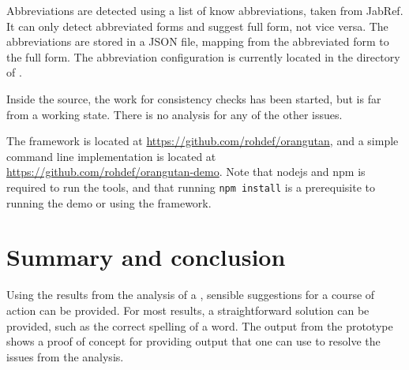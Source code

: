 Abbreviations are detected using a list of know abbreviations, taken
from JabRef.  It can only detect abbreviated forms and suggest full
form, not vice versa.  The abbreviations are stored in a JSON file,
mapping from the abbreviated form to the full form. The abbreviation
configuration is currently located in the directory of {\orangutan}.

Inside the {\orangutan} source, the work for consistency checks has
been started, but is far from a working state.  There is no analysis
for any of the other issues.

The {\orangutan} framework is located at
\url{https://github.com/rohdef/orangutan}, and a simple command line
implementation is located at
\url{https://github.com/rohdef/orangutan-demo}.  Note that nodejs and
npm is required to run the tools, and that running \texttt{npm
  install} is a prerequisite to running the demo or using the
framework.


\section{Summary and conclusion}

Using the results from the analysis of a , sensible
suggestions for a course of action can be provided.  For most results,
a straightforward solution can be provided, such as the correct
spelling of a word.  The output from the prototype {\orangutan} shows
a proof of concept for providing output that one can use to resolve
the issues from the analysis.
